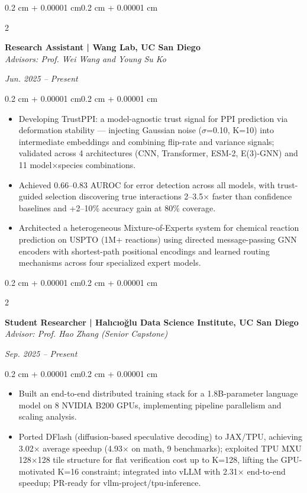 \documentclass[10pt, letterpaper]{article}
\newenvironment{highlights}{
    \begin{itemize}[
        topsep=0.10 cm,
        parsep=0.10 cm,
        partopsep=0pt,
        itemsep=0pt,
        leftmargin=0.4 cm + 10pt
    ]
}{\end{itemize}}
\newenvironment{onecolentry}{
    \begin{adjustwidth}{0.2 cm + 0.00001 cm}{0.2 cm + 0.00001 cm}
}{\end{adjustwidth}}
\newenvironment{twocolentry}[2][]{
    \onecolentry
    \def\secondColumn{#2}
    \setcolumnwidth{\fill, 4.5 cm}
    \begin{paracol}{2}
}{
    \switchcolumn \raggedleft \secondColumn
    \end{paracol}
    \endonecolentry
}
\begin{document}
    \begin{twocolentry}{\textit{Jun. 2025 -- Present}}
        \textbf{Research Assistant | Wang Lab, UC San Diego}\\
        \textit{Advisors: Prof. Wei Wang and Young Su Ko}
    \end{twocolentry}
    \vspace{0.10 cm}
    \begin{onecolentry}
        \begin{highlights}
            \item Developing TrustPPI: a model-agnostic trust signal for PPI prediction via deformation stability — injecting Gaussian noise ($\sigma$=0.10, K=10) into intermediate embeddings and combining flip-rate and variance signals; validated across 4 architectures (CNN, Transformer, ESM-2, E(3)-GNN) and 11 model$\times$species combinations.
            \item Achieved 0.66--0.83 AUROC for error detection across all models, with trust-guided selection discovering true interactions 2--3.5$\times$ faster than confidence baselines and +2--10\% accuracy gain at 80\% coverage.
            \item Architected a heterogeneous Mixture-of-Experts system for chemical reaction prediction on USPTO (1M+ reactions) using directed message-passing GNN encoders with shortest-path positional encodings and learned routing mechanisms across four specialized expert models.
        \end{highlights}
    \end{onecolentry}
    \vspace{0.20 cm}

    \begin{twocolentry}{\textit{Sep. 2025 -- Present}}
        \textbf{Student Researcher | Halıcıo\u{g}lu Data Science Institute, UC San Diego}\\
        \textit{Advisor: Prof. Hao Zhang (Senior Capstone)}
    \end{twocolentry}
    \vspace{0.10 cm}
    \begin{onecolentry}
        \begin{highlights}
            \item Built an end-to-end distributed training stack for a 1.8B-parameter language model on 8 NVIDIA B200 GPUs, implementing pipeline parallelism and scaling analysis.
            \item Ported DFlash (diffusion-based speculative decoding) to JAX/TPU, achieving 3.02$\times$ average speedup (4.93$\times$ on math, 9 benchmarks); exploited TPU MXU 128$\times$128 tile structure for flat verification cost up to K=128, lifting the GPU-motivated K=16 constraint; integrated into vLLM with 2.31$\times$ end-to-end speedup; PR-ready for vllm-project/tpu-inference.
        \end{highlights}
    \end{onecolentry}
    \vspace{0.20 cm}
\end{document}
